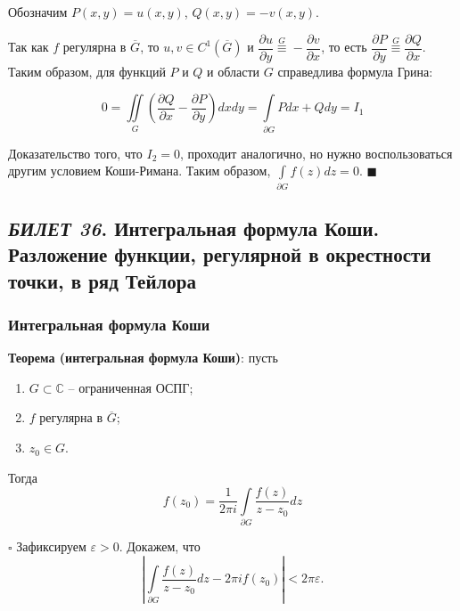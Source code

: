 \documentclass[12pt, a4paper, reqno]{article}
\begin{document}
    Обозначим $P(x, y) = u(x, y)$, $Q(x, y) = -v(x, y)$.

    Так как $f$ регулярна в $\overline{G}$, то $u, v \in C^1(\overline{G})$ и
    $\dfrac{\partial u}{\partial y} \overset{G}{\equiv} -\dfrac{\partial v}{\partial x}$, то есть
    $\dfrac{\partial P}{\partial y} \overset{G}{\equiv} \dfrac{\partial Q}{\partial x}$. Таким
    образом, для функций $P$ и $Q$ и области $G$ справедлива формула Грина:

    \begin{equation*}
        0 = \iint\limits_{G} \left(\frac{\partial Q}{\partial x} - \frac{\partial P}{\partial y}\right) dx dy =
        \int\limits_{\partial G} Pdx + Qdy = I_1
    \end{equation*}

    Доказательство того, что $I_2 = 0$, проходит аналогично, но нужно воспользоваться другим
    условием Коши-Римана. Таким образом, $\int\limits_{\partial G} f(z)dz = 0$. $\blacksquare$

\newpage
\subsection{\textit{БИЛЕТ 36}. Интегральная формула Коши. Разложение функции, регулярной в окрестности
            точки, в ряд Тейлора}

    \subsubsection{Интегральная формула Коши}

    \textbf{Теорема (интегральная формула Коши)}: пусть
    \begin{enumerate}
        \item $G \subset \mathbb{C}$ -- ограниченная ОСПГ;
        \item $f$ регулярна в $\overline{G}$;
        \item $z_0 \in G$.
    \end{enumerate}
    Тогда
    \begin{equation*}
        \boxed{f(z_0) = \frac{1}{2\pi i}\int\limits_{\partial G}\frac{f(z)}{z - z_0}dz}
    \end{equation*}

    $\square$ Зафиксируем $\varepsilon > 0$. Докажем, что
    \begin{equation*}
        \left|\int\limits_{\partial G}\frac{f(z)}{z - z_0}dz - 2\pi i f(z_0)\right| < 2 \pi\varepsilon.
    \end{equation*}
\end{document}
